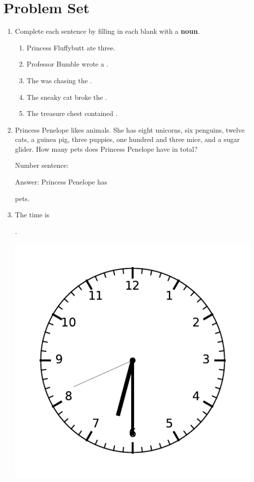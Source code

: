 \documentclass{tufte-book}
\begin{document}
\clearpage\section{Problem Set }

\begin{enumerate}
  \item Complete each sentence by filling in each blank with a \textbf{noun}.
  \begin{enumerate}
    \bigskip
    \item Princess Fluffybutt ate three\dotfill.\bigskip
    \item Professor Bumble wrote a \dotfill.\bigskip
    \item The \dotfill was chasing the \dotfill.\bigskip
    \item The sneaky cat broke the \dotfill.\bigskip
    \item The treasure chest contained \dotfill.\bigskip
  \end{enumerate}

  \item Princess Penelope likes animals. 
  She has eight unicorns, six penguins, twelve cats, a guinea pig, three puppies,
  one hundred and three mice, and a sugar glider.
  How many pets does Princess Penelope have in total?\bigskip\par
  Number sentence: \dotfill\bigskip\par
  Answer: Princess Penelope has \dotfill\bigskip\par\dotfill\bigskip pets.

  \item The time is \dotfill\bigskip\par\dotfill\bigskip.
  \begin{marginfigure}\includegraphics[width=\textwidth]{maths/fig/clock_0630.pdf}\end{marginfigure}


\end{enumerate}
\end{document}
